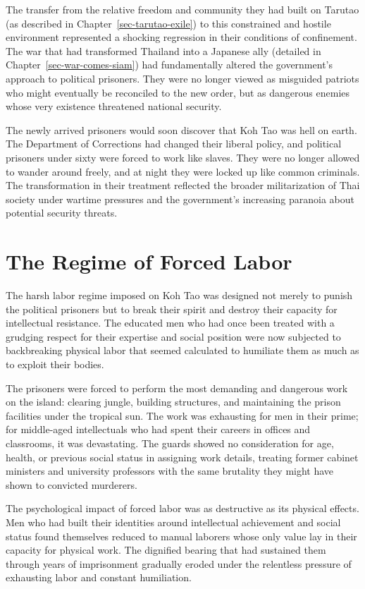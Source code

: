 \documentclass[
  Letterpaper,
]{scrbook}
\begin{document}
The transfer from the relative freedom and community they had built on
Tarutao (as described in Chapter~\ref{sec-tarutao-exile}) to this
constrained and hostile environment represented a shocking regression in
their conditions of confinement. The war that had transformed Thailand
into a Japanese ally (detailed in Chapter~\ref{sec-war-comes-siam}) had
fundamentally altered the government's approach to political prisoners.
They were no longer viewed as misguided patriots who might eventually be
reconciled to the new order, but as dangerous enemies whose very
existence threatened national security.

The newly arrived prisoners would soon discover that Koh Tao was hell on
earth. The Department of Corrections had changed their liberal policy,
and political prisoners under sixty were forced to work like slaves.
They were no longer allowed to wander around freely, and at night they
were locked up like common criminals. The transformation in their
treatment reflected the broader militarization of Thai society under
wartime pressures and the government's increasing paranoia about
potential security threats.

\section{The Regime of Forced Labor}\label{the-regime-of-forced-labor}

The harsh labor regime imposed on Koh Tao was designed not merely to
punish the political prisoners but to break their spirit and destroy
their capacity for intellectual resistance. The educated men who had
once been treated with a grudging respect for their expertise and social
position were now subjected to backbreaking physical labor that seemed
calculated to humiliate them as much as to exploit their bodies.

The prisoners were forced to perform the most demanding and dangerous
work on the island: clearing jungle, building structures, and
maintaining the prison facilities under the tropical sun. The work was
exhausting for men in their prime; for middle-aged intellectuals who had
spent their careers in offices and classrooms, it was devastating. The
guards showed no consideration for age, health, or previous social
status in assigning work details, treating former cabinet ministers and
university professors with the same brutality they might have shown to
convicted murderers.

The psychological impact of forced labor was as destructive as its
physical effects. Men who had built their identities around intellectual
achievement and social status found themselves reduced to manual
laborers whose only value lay in their capacity for physical work. The
dignified bearing that had sustained them through years of imprisonment
gradually eroded under the relentless pressure of exhausting labor and
constant humiliation.
\end{document}
